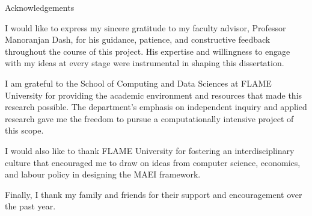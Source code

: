 \begin{Chapter}{Acknowledgements}

I would like to express my sincere gratitude to my faculty advisor, Professor Manoranjan Dash, for his guidance, patience, and constructive feedback throughout the course of this project. His expertise and willingness to engage with my ideas at every stage were instrumental in shaping this dissertation.

I am grateful to the School of Computing and Data Sciences at FLAME University for providing the academic environment and resources that made this research possible. The department's emphasis on independent inquiry and applied research gave me the freedom to pursue a computationally intensive project of this scope.

I would also like to thank FLAME University for fostering an interdisciplinary culture that encouraged me to draw on ideas from computer science, economics, and labour policy in designing the MAEI framework.

Finally, I thank my family and friends for their support and encouragement over the past year.

\end{Chapter}
\clearpage
